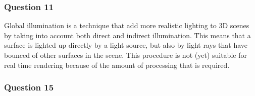 \documentclass[a4paper]{article}
\begin{document}
\subsubsection*{Question 11}
    Global illumination is a technique that add more realistic lighting to 3D
    scenes by taking into account both direct and indirect illumination.
    This means that a surface is lighted up directly by a light source, but also
    by light rays that have bounced of other surfaces in the scene. This
    procedure is not (yet) suitable for real time rendering because of the
    amount of processing that is required. 

\subsubsection*{Question 15}
\end{document}
